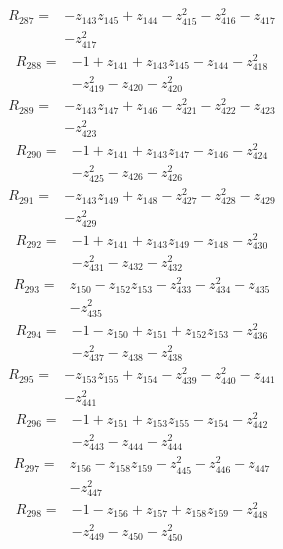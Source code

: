 \begin{align*}
R_{287}={}&-z_{143}z_{145}+z_{144}-z_{415}^{2}-z_{416}^{2}-z_{417}\\
&-z_{417}^{2}
\end{align*}
\begin{align*}
R_{288}={}&-1+z_{141}+z_{143}z_{145}-z_{144}-z_{418}^{2}\\
&-z_{419}^{2}-z_{420}-z_{420}^{2}
\end{align*}
\begin{align*}
R_{289}={}&-z_{143}z_{147}+z_{146}-z_{421}^{2}-z_{422}^{2}-z_{423}\\
&-z_{423}^{2}
\end{align*}
\begin{align*}
R_{290}={}&-1+z_{141}+z_{143}z_{147}-z_{146}-z_{424}^{2}\\
&-z_{425}^{2}-z_{426}-z_{426}^{2}
\end{align*}
\begin{align*}
R_{291}={}&-z_{143}z_{149}+z_{148}-z_{427}^{2}-z_{428}^{2}-z_{429}\\
&-z_{429}^{2}
\end{align*}
\begin{align*}
R_{292}={}&-1+z_{141}+z_{143}z_{149}-z_{148}-z_{430}^{2}\\
&-z_{431}^{2}-z_{432}-z_{432}^{2}
\end{align*}
\begin{align*}
R_{293}={}&z_{150}-z_{152}z_{153}-z_{433}^{2}-z_{434}^{2}-z_{435}\\
&-z_{435}^{2}
\end{align*}
\begin{align*}
R_{294}={}&-1-z_{150}+z_{151}+z_{152}z_{153}-z_{436}^{2}\\
&-z_{437}^{2}-z_{438}-z_{438}^{2}
\end{align*}
\begin{align*}
R_{295}={}&-z_{153}z_{155}+z_{154}-z_{439}^{2}-z_{440}^{2}-z_{441}\\
&-z_{441}^{2}
\end{align*}
\begin{align*}
R_{296}={}&-1+z_{151}+z_{153}z_{155}-z_{154}-z_{442}^{2}\\
&-z_{443}^{2}-z_{444}-z_{444}^{2}
\end{align*}
\begin{align*}
R_{297}={}&z_{156}-z_{158}z_{159}-z_{445}^{2}-z_{446}^{2}-z_{447}\\
&-z_{447}^{2}
\end{align*}
\begin{align*}
R_{298}={}&-1-z_{156}+z_{157}+z_{158}z_{159}-z_{448}^{2}\\
&-z_{449}^{2}-z_{450}-z_{450}^{2}
\end{align*}
